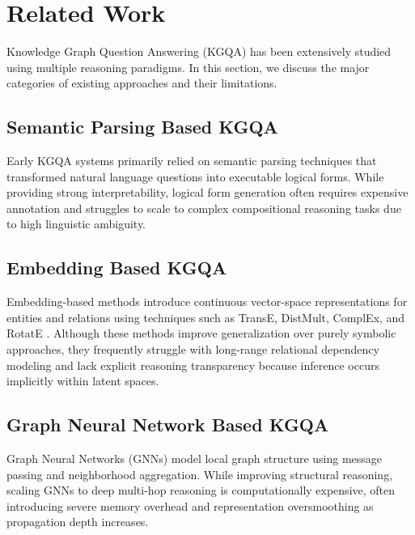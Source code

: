\documentclass[10pt,conference]{IEEEtran}
\begin{document}

\section{Related Work}

Knowledge Graph Question Answering (KGQA) has been extensively studied using multiple reasoning paradigms. In this section, we discuss the major categories of existing approaches and their limitations.

\subsection{Semantic Parsing Based KGQA}
Early KGQA systems primarily relied on semantic parsing techniques \cite{yih2015semantic, bao2016constraint} that transformed natural language questions into executable logical forms. While providing strong interpretability, logical form generation often requires expensive annotation and struggles to scale to complex compositional reasoning tasks due to high linguistic ambiguity.

\subsection{Embedding Based KGQA}
Embedding-based methods introduce continuous vector-space representations for entities and relations using techniques such as TransE, DistMult, ComplEx, and RotatE \cite{bordes2013translating, yang2014embedding, trouillon2016complex, sun2019rotate, saxena2020improving, sun2020faithful}. Although these methods improve generalization over purely symbolic approaches, they frequently struggle with long-range relational dependency modeling and lack explicit reasoning transparency because inference occurs implicitly within latent spaces.

\subsection{Graph Neural Network Based KGQA}
Graph Neural Networks (GNNs) \cite{kipf2016semi, velickovic2017graph, schlichtkrull2018modeling, yasunaga2021qa, zhang2022subgraph} model local graph structure using message passing and neighborhood aggregation. While improving structural reasoning, scaling GNNs to deep multi-hop reasoning is computationally expensive, often introducing severe memory overhead and representation oversmoothing as propagation depth increases.
\end{document}
